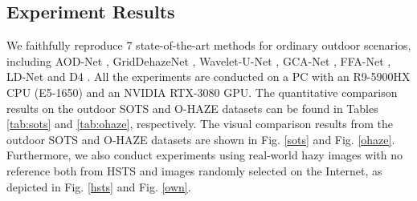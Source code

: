\documentclass[lettersize,journal]{IEEEtran}
\begin{document}
\subsection{Experiment Results}
We faithfully reproduce 7 state-of-the-art methods for ordinary outdoor scenarios, including AOD-Net \cite{li2017aod}, GridDehazeNet \cite{liu2019griddehazenet}, Wavelet-U-Net \cite{yang2019wavelet}, GCA-Net \cite{chen2019gated}, FFA-Net \cite{qin2020ffa}, LD-Net 
\cite{ullah2021light} and D4 \cite{yang2022d4}. All the experiments are conducted on a PC with an R9-5900HX CPU (E5-1650) and an NVIDIA RTX-3080 GPU. The quantitative comparison results on the outdoor SOTS and O-HAZE datasets can be found in Tables \ref{tab:sots} and \ref{tab:ohaze}, respectively. The visual comparison results from the outdoor SOTS and O-HAZE datasets are shown in Fig. \ref{sots} and Fig. \ref{ohaze}. Furthermore, we also conduct experiments using real-world hazy images with no reference both from HSTS and images randomly selected on the Internet, as depicted in Fig. \ref{hsts} and Fig. \ref{own}. 
\end{document}
